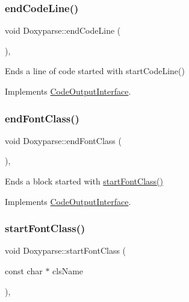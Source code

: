 \subsubsection{\texorpdfstring{endCodeLine()}{endCodeLine()}}
{\footnotesize\ttfamily void Doxyparse\+::end\+Code\+Line (\begin{DoxyParamCaption}{ }\end{DoxyParamCaption})\hspace{0.3cm}{\ttfamily [inline]}, {\ttfamily [virtual]}}

Ends a line of code started with start\+Code\+Line() 

Implements \mbox{\hyperlink{class_code_output_interface_afac5763eafc78f93b82691fb9a6dcff7}{Code\+Output\+Interface}}.

\mbox{\label{class_doxyparse_a3c7ba846a59b1aff41ab0395b2e6dd8f}} 
\subsubsection{\texorpdfstring{endFontClass()}{endFontClass()}}
{\footnotesize\ttfamily void Doxyparse\+::end\+Font\+Class (\begin{DoxyParamCaption}{ }\end{DoxyParamCaption})\hspace{0.3cm}{\ttfamily [inline]}, {\ttfamily [virtual]}}

Ends a block started with \mbox{\hyperlink{class_doxyparse_aa74b254b1e80ccf48d17acfa119e7704}{start\+Font\+Class()}} 

Implements \mbox{\hyperlink{class_code_output_interface_a2b8ac05a391dae36793aa3aa8714a0f6}{Code\+Output\+Interface}}.

\mbox{\label{class_doxyparse_aa74b254b1e80ccf48d17acfa119e7704}} 
\subsubsection{\texorpdfstring{startFontClass()}{startFontClass()}}
{\footnotesize\ttfamily void Doxyparse\+::start\+Font\+Class (\begin{DoxyParamCaption}\item[{const char $\ast$}]{cls\+Name }\end{DoxyParamCaption})\hspace{0.3cm}{\ttfamily [inline]}, {\ttfamily [virtual]}}


